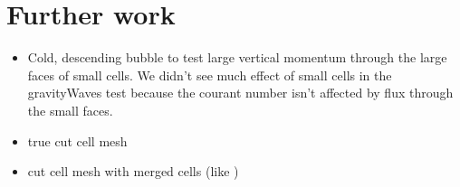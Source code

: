\chapter{Further work}

\begin{itemize}
\item Cold, descending bubble to test large vertical momentum through the large faces of small cells.  We didn't see much effect of small cells in the gravityWaves test because the courant number isn't affected by flux through the small faces.
\item true cut cell mesh
\item cut cell mesh with merged cells (like \textcite{yamazaki-satomura2010})
\end{itemize}
